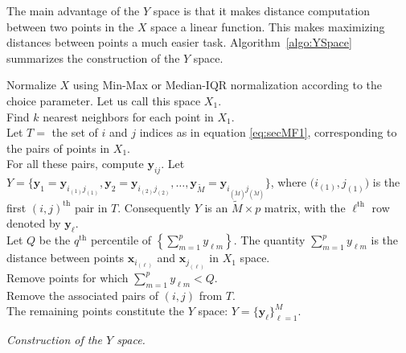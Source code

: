 \documentclass[letter,12pt]{article}
\begin{document}
The main advantage of the $Y$ space is that it makes distance computation between two points in the $X$ space a linear function. This makes maximizing distances between points a much easier task.
Algorithm~\ref{algo:YSpace} summarizes the construction of the $Y$ space.

\DontPrintSemicolon
\begin{algorithm}\fontsize{11}{12}\selectfont
	Normalize $X$ using { \color{blue} Min-Max or Median-IQR normalization according to the choice parameter}. Let us call this space $X_1$. \\
	{ \color{blue}Find $k$ nearest neighbors for each point in $X_1$.} \\
	Let $T = $ the set of $i$ and $j$ indices { \color{blue} as in equation \eqref{eq:secMF1}},  corresponding to the pairs of points in $X_1$. \\
	{ \color{blue} For all these pairs, compute $\bm{y}_{ij}$.} Let $Y =\big\{ \bm{y}_{1} =\bm{y}_{i_{(1)}j_{(1)}} , \bm{y}_{2} =\bm{y}_{i_{(2)}j_{(2)}}, \dots, \bm{y}_{\tilde{M}} =\bm{y}_{i_{(\tilde{M})}j_{(\tilde{M})}} \big\}$, where $\big( i_{(1)},j_{(1)} \big)$ is the first $(i, j)^{\text{th}}$ pair in $T$. Consequently $Y$ is an $\tilde{M}\times p$ matrix, with the $\ell^{\text{th}}$ row denoted by $\bm{y}_\ell$.\\
	Let $Q$ be the $q^{\text{th}}$ percentile of $ \left\{\sum_{m=1}^p {y}_{\ell m}\right\}$. The quantity $\sum_{m=1}^p {y}_{\ell m}$ is the distance between points $\bm{x}_{i_{(\ell)}}$ and $\bm{x}_{j_{(\ell)}}$ in $X_1$ space. \\
	Remove points for which $ \sum_{m=1}^p {y}_{\ell m} < Q $. \\
	Remove the associated pairs of $(i, j)$ from $T$. \\
	The remaining points constitute the $Y$ space: $Y = \{\bm{y}_\ell \}_{\ell=1}^M$.
	\caption{\itshape Construction of the $Y$ space.}
	\label{algo:YSpace}
\end{algorithm}
\end{document}
